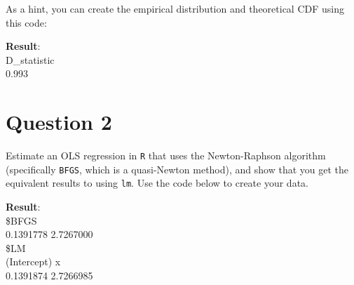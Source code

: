 \documentclass[12pt,letterpaper]{article}
\begin{document}
	
\noindent As a hint, you can create the empirical distribution and theoretical CDF using this code:

\vspace{.5cm}
 
\textbf{Result}:\\
D\_statistic\\
 0.993
\vspace{3in}

\section*{Question 2}
\noindent Estimate an OLS regression in \texttt{R} that uses the Newton-Raphson algorithm (specifically \texttt{BFGS}, which is a quasi-Newton method), and show that you get the equivalent results to using \texttt{lm}. Use the code below to create your data.
\vspace{.5cm}
 
\textbf{Result}:\\
\$BFGS\\
 0.1391778 2.7267000\\
\$LM\\
(Intercept)           x \\
0.1391874   2.7266985 
\end{document}
